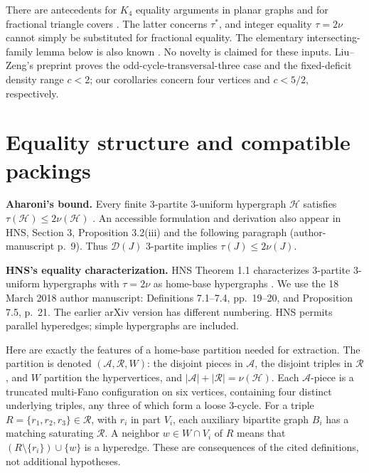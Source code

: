 \documentclass[11pt]{article}
\theoremstyle{definition}\newtheorem{definition}[theorem]{Definition}
\theoremstyle{remark}\newtheorem{remark}[theorem]{Remark}
\newcommand{\D}{\mathcal D}
\begin{document}
There are antecedents for $K_4$ equality arguments in planar graphs
\cite{CHM} and for fractional triangle covers \cite{HKT}. The latter concerns
$\tau^*$, and integer equality $\tau=2\nu$ cannot simply be substituted for
fractional equality. The elementary intersecting-family lemma below is also
known \cite{AZ}. No novelty is claimed for these inputs. Liu--Zeng's
preprint \cite{LZ} proves the odd-cycle-transversal-three case and the
fixed-deficit density range $c<2$; our corollaries concern four vertices and
$c<5/2$, respectively.


\section{Equality structure and compatible packings}\label{sec:equality}

\par\medskip\noindent\textbf{Aharoni's bound.}
Every finite 3-partite 3-uniform hypergraph $\mathcal H$ satisfies
$\tau(\mathcal H)\le2\nu(\mathcal H)$ \cite{Aharoni}.
An accessible formulation and derivation also appear in HNS, Section 3,
Proposition 3.2(iii) and the following paragraph (author-manuscript p.~9).
Thus $\D(J)$ 3-partite implies $\tau(J)\le2\nu(J)$.

\par\medskip\noindent\textbf{HNS's equality characterization.}
HNS Theorem 1.1 characterizes 3-partite 3-uniform hypergraphs with
$\tau=2\nu$ as home-base hypergraphs \cite{HNS}. We use the 18 March 2018
author manuscript: Definitions 7.1--7.4, pp.~19--20, and Proposition 7.5,
p.~21. The earlier arXiv version has different numbering. HNS permits
parallel hyperedges; simple hypergraphs are included.

Here are exactly the features of a home-base partition needed for extraction.
The partition is denoted $(\mathcal A,\mathcal R,W)$: the disjoint pieces
in $\mathcal A$, the disjoint triples in $\mathcal R$, and $W$ partition
the hypervertices, and $|\mathcal A|+|\mathcal R|=\nu(\mathcal H)$.
Each $\mathcal A$-piece is a truncated multi-Fano configuration on six
vertices, containing four distinct underlying triples, any three of which
form a loose 3-cycle. For a triple $R=\{r_1,r_2,r_3\}\in\mathcal R$,
with $r_i$ in part $V_i$, each auxiliary bipartite graph $B_i$ has a
matching saturating $\mathcal R$. A neighbor $w\in W\cap V_i$ of $R$
means that $(R\setminus\{r_i\})\cup\{w\}$ is a hyperedge.
These are consequences of the cited definitions, not additional hypotheses.
\end{document}
